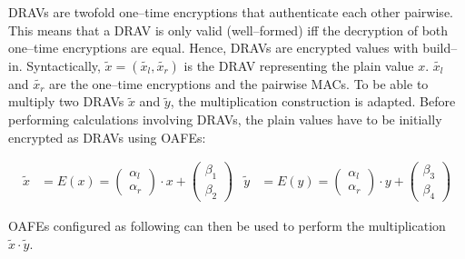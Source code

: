 DRAVs are twofold one--time encryptions that authenticate each other pairwise.
This means that a DRAV is only valid (well--formed) iff the decryption of both
one--time encryptions are equal. Hence, DRAVs are encrypted values with
 build--in. Syntactically,
$\widetilde{x} = (\widetilde{x_l}, \widetilde{x_r})$ is the DRAV representing
the plain value $x$. $\widetilde{x_l}$ and $\widetilde{x_r}$ are the one--time
encryptions and the pairwise MACs. To be able to multiply two DRAVs
$\widetilde{x}$ and $\widetilde{y}$, the multiplication construction is adapted.
Before performing calculations involving DRAVs, the plain values have to be
initially encrypted as DRAVs using OAFEs:

\begin{align*}
  \widetilde{x} & = E(x) =
\begin{pmatrix}\alpha_l\\\alpha_r\end{pmatrix} \cdot x +
\begin{pmatrix}\beta_1\\\beta_2\end{pmatrix} &
  \widetilde{y} & = E(y) =
\begin{pmatrix}\alpha_l\\\alpha_r\end{pmatrix} \cdot y +
\begin{pmatrix}\beta_3\\\beta_4\end{pmatrix}
\end{align*}

\noindent{}OAFEs configured as following can then be used to perform the
multiplication $\widetilde{x} \cdot \widetilde{y}$.

